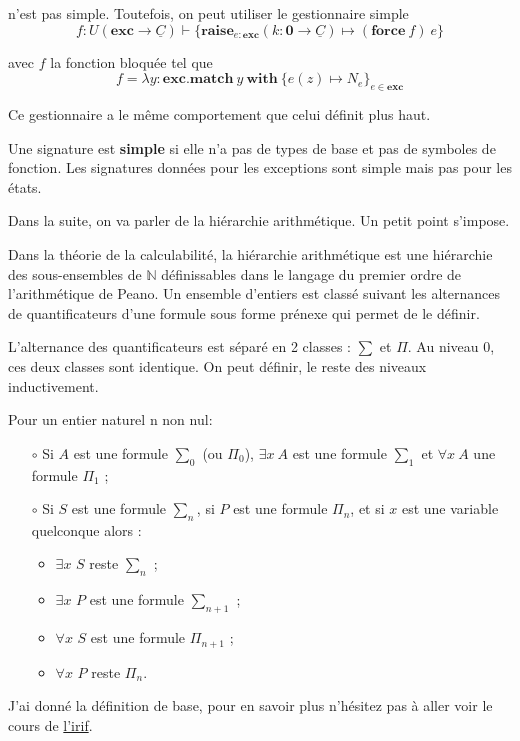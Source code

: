 n'est pas simple. Toutefois, on peut utiliser le gestionnaire simple
\[f:U(\textbf{exc} \rightarrow \underline{C}) \vdash \{\textbf{raise}_{e : \textbf{exc}}(k:\textbf{0} \rightarrow \underline{C}) \mapsto (\textbf{force}~f)~e\}\]

avec  $f$ la fonction bloquée tel que 
	\[f = \lambda y:\textbf{exc}.\textbf{match}~y~\textbf{with}~\{e(z) \mapsto N_e\}_{e \in \textbf{exc}}\]
	
	
Ce gestionnaire a le même comportement que celui définit plus haut.

\begin{remark}
	Une signature est \textbf{simple} si elle n'a pas de types de base et pas de symboles de fonction. Les signatures données pour les exceptions sont simple mais pas pour les états.
\end{remark}

\begin{remark}
	Dans la suite, on va parler de la hiérarchie arithmétique. Un petit point s'impose.

	Dans la théorie de la calculabilité, la hiérarchie arithmétique est une hiérarchie des sous-ensembles de $\mathbb{N}$ 
	définissables dans le langage du premier ordre de l'arithmétique de Peano. Un ensemble d'entiers est classé suivant 
	les alternances de quantificateurs d'une formule sous forme prénexe qui permet de le définir. 


	L'alternance des quantificateurs est séparé en 2 classes : $\sum$ et $\Pi$. Au niveau 0, ces deux classes sont
	identique. On peut définir, le reste des niveaux inductivement.
	\medbreak

	Pour un entier naturel n non nul:
	\begin{enumerate}
		\item[$\circ$] Si $A$ est une formule $\sum_0$ (ou $\Pi_0$), $\exists x~A$ est une formule $\sum_1$ 
		et $\forall x~A$ une formule $\Pi_1$ ;
		\item[$\circ$] Si $S$ est une formule $\sum_n$, si $P$ est une formule $\Pi_n$, et si $x$ est une variable 
		quelconque alors :
		\begin{itemize}
			\item $\exists x$ $S$ reste $\sum_n$ ;
			\item $\exists x$ $P$ est une formule $\sum_{n+1}$ ;
			\item $\forall x$ $S$ est une formule $\Pi_{n+1}$ ;
			\item $\forall x$ $P$ reste $\Pi_n$.
		\end{itemize}
	\end{enumerate}

	
	J'ai donné la définition de base, pour en savoir plus n'hésitez pas à aller voir le cours de \href{https://www.irif.fr/~roziere//m2cf2/}{l'irif}.
    
\end{remark}

